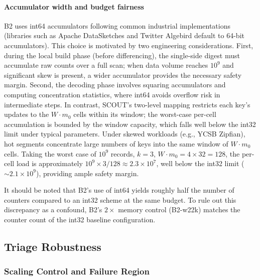 \paragraph{Accumulator width and budget fairness}

B2 uses int64 accumulators following common industrial implementations (libraries such as Apache DataSketches and Twitter Algebird default to 64-bit accumulators). This choice is motivated by two engineering considerations. First, during the local build phase (before differencing), the single-side digest must accumulate raw counts over a full scan; when data volume reaches $10^9$ and significant skew is present, a wider accumulator provides the necessary safety margin. Second, the decoding phase involves squaring accumulators and computing concentration statistics, where int64 avoids overflow risk in intermediate steps.
In contrast, SCOUT's two-level mapping restricts each key's updates to the $W \cdot m_0$ cells within its window; the worst-case per-cell accumulation is bounded by the window capacity, which falls well below the int32 limit under typical parameters. Under skewed workloads (e.g., YCSB Zipfian), hot segments concentrate large numbers of keys into the same window of $W \cdot m_0$ cells. Taking the worst case of $10^9$ records, $k{=}3$, $W \cdot m_0 = 4 \times 32 = 128$, the per-cell load is approximately $10^9 \times 3 / 128 \approx 2.3 \times 10^7$, well below the int32 limit (${\sim}2.1 \times 10^9$), providing ample safety margin.

It should be noted that B2's use of int64 yields roughly half the number of counters compared to an int32 scheme at the same budget. To rule out this discrepancy as a confound, B2's $2\times$ memory control (B2-w22k) matches the counter count of the int32 baseline configuration.




\subsection{Triage Robustness}
\label{sec:appendix-comp-triage}

\subsubsection{Scaling Control and Failure Region}

